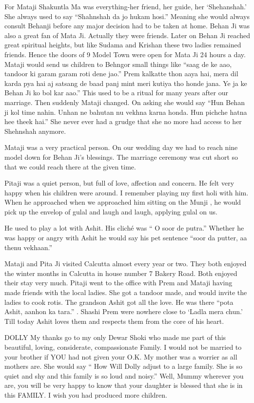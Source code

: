 For Mataji Shakuntla Ma was everything-her friend, her guide, her ‘Shehanshah.’ She always used to say “Shahnshah da jo hukam hosi.” Meaning she would always consult Behanji before any major decision had to be taken at home. Behan Ji was also a great fan of Mata Ji. Actually they were friends. Later on Behan Ji reached great spiritual heights, but like Sudama and Krishan these two ladies remained friends. Hence the doors of 9 Model Town were open for Mata Ji 24 hours a day. Mataji would send us children to Behngor small things like “saag de ke aao, tandoor ki garam garam roti dene jao.” Prem kalkatte thon aaya hai, mera dil karda pya hai aj satsang de baad panj mint meri kutiya tho honde jana. Ye ja ke Behan Ji ko bol kar aao.” This used to be a ritual for many years after our marriage. Then suddenly Mataji changed. On asking she would say “Hun Behan ji kol time nahin. Unhan ne bahutan nu vekhna karna honda. Hun pichche hatna hee theek hai.” She never ever had a grudge that she no more had access to her Shehnshah anymore. 

Mataji was a very practical person. On our wedding day we had to reach nine model down for Behan Ji’s blessings. The marriage ceremony was cut short so that we could reach there at the given time.

Pitaji was a quiet person, but full of love, affection and concern. He felt very happy when his children were around. I remember playing my first holi with him. When he approached when we approached him sitting on the Munji , he would pick up the envelop of gulal and laugh and laugh, applying gulal on us. 

He used to play a lot with Ashit. His cliché was “ O soor de putra.” Whether he was happy or angry with Ashit he would say his pet sentence “soor da putter, aa thenu vekhaan.” 

Mataji and Pita Ji visited Calcutta almost every year or two. They both enjoyed the winter months in Calcutta in house number 7 Bakery Road. Both enjoyed their stay very much. Pitaji went to the office with Prem and Mataji having made friends with the local ladies. She got a tandoor made, and would invite the ladies to cook rotis. The grandson Ashit got all the love. He was there “pota Ashit, aanhon ka tara.” . Shashi Prem were nowhere close to ‘Ladla mera chun.’ Till today Ashit loves them and respects them from the core of his heart.





DOLLY
My thanks go to my only Dewar Shoki who made me part of this beautiful, loving, considerate, compassionate Family. I would not be married to your brother if YOU had not given your O.K. 
My mother was a worrier as all mothers are. She would say “ How Will Dolly adjust to a large family. She is so quiet and shy and this family is so loud and noisy.” Well, Mummy wherever you are, you will be very happy to know that your daughter is blessed that she is in this FAMILY. I wish you had produced more children. 

